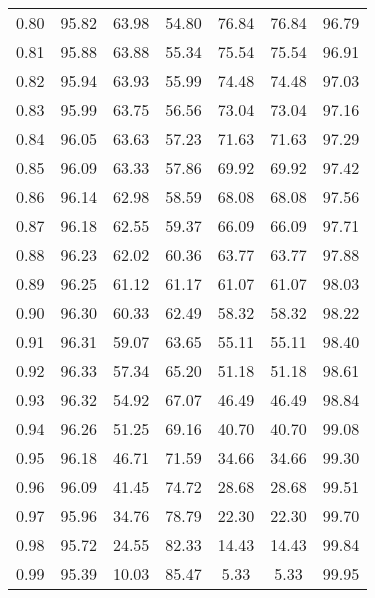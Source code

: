 \begin{tabular}{|c|c|c|c|c|c|c|}
      0.80 &     95.82 &     63.98 &      54.80 &   76.84 &      76.84 &         96.79 \\
      0.81 &     95.88 &     63.88 &      55.34 &   75.54 &      75.54 &         96.91 \\
      0.82 &     95.94 &     63.93 &      55.99 &   74.48 &      74.48 &         97.03 \\
      0.83 &     95.99 &     63.75 &      56.56 &   73.04 &      73.04 &         97.16 \\
      0.84 &     96.05 &     63.63 &      57.23 &   71.63 &      71.63 &         97.29 \\
      0.85 &     96.09 &     63.33 &      57.86 &   69.92 &      69.92 &         97.42 \\
      0.86 &     96.14 &     62.98 &      58.59 &   68.08 &      68.08 &         97.56 \\
      0.87 &     96.18 &     62.55 &      59.37 &   66.09 &      66.09 &         97.71 \\
      0.88 &     96.23 &     62.02 &      60.36 &   63.77 &      63.77 &         97.88 \\
      0.89 &     96.25 &     61.12 &      61.17 &   61.07 &      61.07 &         98.03 \\
      0.90 &     96.30 &     60.33 &      62.49 &   58.32 &      58.32 &         98.22 \\
      0.91 &     96.31 &     59.07 &      63.65 &   55.11 &      55.11 &         98.40 \\
      0.92 &     96.33 &     57.34 &      65.20 &   51.18 &      51.18 &         98.61 \\
      0.93 &     96.32 &     54.92 &      67.07 &   46.49 &      46.49 &         98.84 \\
      0.94 &     96.26 &     51.25 &      69.16 &   40.70 &      40.70 &         99.08 \\
      0.95 &     96.18 &     46.71 &      71.59 &   34.66 &      34.66 &         99.30 \\
      0.96 &     96.09 &     41.45 &      74.72 &   28.68 &      28.68 &         99.51 \\
      0.97 &     95.96 &     34.76 &      78.79 &   22.30 &      22.30 &         99.70 \\
      0.98 &     95.72 &     24.55 &      82.33 &   14.43 &      14.43 &         99.84 \\
      0.99 &     95.39 &     10.03 &      85.47 &    5.33 &       5.33 &         99.95 \\
\bottomrule
\end{tabular}
